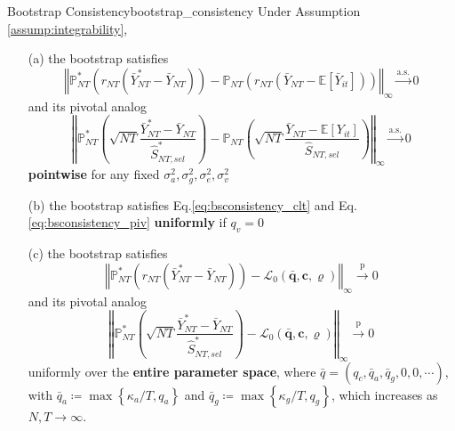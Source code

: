 \documentclass[twoside]{article}
\begin{document}
\begin{theorem}{Bootstrap Consistency}{bootstrap_consistency}
    Under Assumption \ref{assump:integrability}, 
    \begin{itemize}
        \item[(a)] the bootstrap  satisfies 
        \begin{equation}\label{eq:bsconsistency_clt}
            \left\Vert \mathbb{P}^*_{NT}\left( r_{NT} \left(\bar{Y}^*_{NT}-\bar{Y}_{NT}\right) \right) - \mathbb{P}_{NT}\left( r_{NT} \left(\bar{Y}_{NT}-\mathbb{E}\left[\bar{Y}_{it}\right]\right) \right) \right\Vert _{\infty} \xrightarrow{\text{a.s.}} 0
        \end{equation}
        and its pivotal analog
        \begin{equation}\label{eq:bsconsistency_piv}
            \left\Vert  \mathbb{P}^*_{NT} \left( \sqrt{NT} \frac{\bar{Y}^*_{NT}-\bar{Y}_{NT}}{\hat{S}^*_{NT,sel}} \right) - \mathbb{P}_{NT} \left( \sqrt{NT} \frac{\bar{Y}_{NT}-\mathbb{E}\left[Y_{it}\right]}{\hat{S}_{NT,sel}} \right)   \right\Vert _{\infty} \xrightarrow{\text{a.s.}} 0
        \end{equation}
        \textbf{pointwise} for any fixed $\sigma^2_a,\sigma^2_g,\sigma^2_e,\sigma^2_v$
        \item[(b)] the bootstrap  satisfies Eq.\ref{eq:bsconsistency_clt} and Eq.\ref{eq:bsconsistency_piv} \textbf{uniformly} if $q_v=0$
        \item[(c)] the  bootstrap satisfies
        \begin{equation}\label{eq:bscons_consistency_clt}
            \left\Vert \mathbb{P}^*_{NT}\left( r_{NT} \left(\bar{Y}^*_{NT}-\bar{Y}_{NT}\right) \right) - \mathcal{L}_0\left(\bar{\mathbf{q}},\mathbf{c},\varrho\right) \right\Vert _{\infty} \xrightarrow{\text{p}} 0
        \end{equation}
        and its pivotal analog
        \begin{equation}\label{eq:bscons_consistency_piv}
            \left\Vert  \mathbb{P}^*_{NT} \left( \sqrt{NT} \frac{\bar{Y}^*_{NT}-\bar{Y}_{NT}}{\hat{S}^*_{NT,sel}} \right) - \mathcal{L}_0\left(\bar{\mathbf{q}},\mathbf{c},\varrho\right) \right\Vert _{\infty} \xrightarrow{\text{p}} 0
        \end{equation}
        uniformly over the \textbf{entire parameter space}, where $\bar{q}=\left(q_c,\bar{q}_a,\bar{q}_g,0,0,\cdots\right)$, with $\bar{q}_a\coloneq \max\left\{\kappa_a/T,q_a\right\}$ and $\bar{q}_g \coloneq \max\left\{\kappa_g/T,q_g\right\}$, which increases as $N,T\rightarrow \infty$.
    \end{itemize}
\end{theorem}
\end{document}
